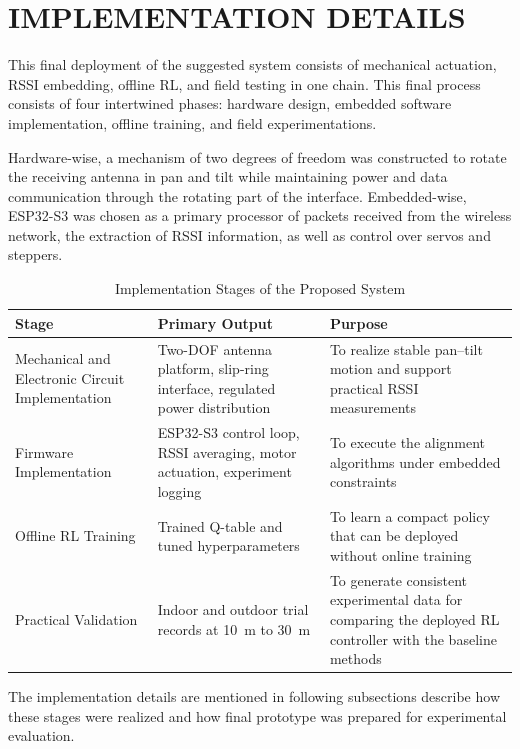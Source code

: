 \newpage
\section{IMPLEMENTATION DETAILS}

This final deployment of the suggested system consists of mechanical actuation, RSSI embedding,
offline RL, and field testing in one chain. This final process consists of four
intertwined phases: hardware design, embedded software implementation, offline
training, and field experimentations.

Hardware-wise, a mechanism of two degrees of freedom was constructed to rotate the
receiving antenna in pan and tilt while maintaining power and data communication
through the rotating part of the interface. Embedded-wise, ESP32-S3 was chosen as a
primary processor of packets received from the wireless network, the extraction of
RSSI information, as well as control over servos and steppers.

\vspace{0.5cm}
\begin{table}[H]
\centering
\caption{Implementation Stages of the Proposed System}
\label{tab:implementation_stages}
\renewcommand{\arraystretch}{1.4}
\begin{tabular}{|
>{\raggedright\arraybackslash}p{3.2cm}|
>{\raggedright\arraybackslash}p{4.2cm}|
>{\raggedright\arraybackslash}p{5.2cm}|
}
\hline
\textbf{Stage} & \textbf{Primary Output} & \textbf{Purpose} \\
\hline
Mechanical and Electronic Circuit Implementation & Two-DOF antenna platform, slip-ring interface, regulated power distribution & To realize stable pan--tilt motion and support practical RSSI measurements \\
\hline
Firmware Implementation & ESP32-S3 control loop, RSSI averaging, motor actuation, experiment logging & To execute the alignment algorithms under embedded constraints \\
\hline
Offline RL Training & Trained Q-table and tuned hyperparameters & To learn a compact policy that can be deployed without online training \\
\hline
Practical Validation & Indoor and outdoor trial records at 10~m to 30~m & To generate consistent experimental data for comparing the deployed RL controller with the baseline methods \\
\hline
\end{tabular}
\end{table}

The implementation details are mentioned in following subsections describe how these stages were
realized and how final prototype was prepared for experimental evaluation.

